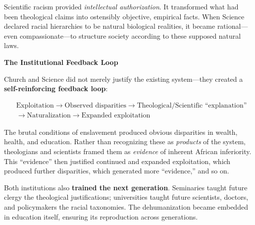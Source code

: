 \documentclass[12pt,openany]{book}
\begin{document}
Scientific racism provided \textit{intellectual authorization}. It transformed what had been theological claims into ostensibly objective, empirical facts. When Science declared racial hierarchies to be natural biological realities, it became rational---even compassionate---to structure society according to these supposed natural laws.

\textbf{The Institutional Feedback Loop}

Church and Science did not merely justify the existing system---they created a \textbf{self-reinforcing feedback loop}:

\[
\begin{aligned}
&\text{Exploitation} \rightarrow \text{Observed disparities} \rightarrow \text{Theological/Scientific ``explanation''} \\
&\rightarrow \text{Naturalization} \rightarrow \text{Expanded exploitation}
\end{aligned}
\]

The brutal conditions of enslavement produced obvious disparities in wealth, health, and education. Rather than recognizing these as \textit{products} of the system, theologians and scientists framed them as \textit{evidence} of inherent African inferiority. This ``evidence'' then justified continued and expanded exploitation, which produced further disparities, which generated more ``evidence,'' and so on.

Both institutions also \textbf{trained the next generation}. Seminaries taught future clergy the theological justifications; universities taught future scientists, doctors, and policymakers the racial taxonomies. The dehumanization became embedded in education itself, ensuring its reproduction across generations.
\end{document}
